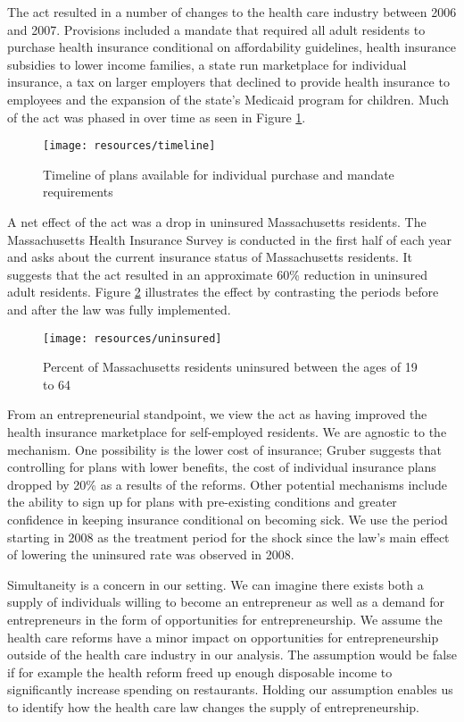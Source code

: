 \documentclass[12pt]{article}
\begin{document}
The act resulted in a number of changes to the health care industry between 2006 and 2007. Provisions included a mandate that required all adult residents to purchase health insurance conditional on affordability guidelines, health insurance subsidies to lower income families, a state run marketplace for individual insurance, a tax on larger employers that declined to provide health insurance to employees and the expansion of the state's Medicaid program for children. Much of the act was phased in over time as seen in Figure \ref{fig:reformTimeline}.

\begin{figure}[H]
	\centering
	\texttt{[image: resources/timeline]}
	\caption{Timeline of plans available for individual purchase and mandate requirements}
	\label{fig:reformTimeline}
\end{figure}

A net effect of the act was a drop in uninsured Massachusetts residents. The Massachusetts Health Insurance Survey is conducted in the first half of each year and asks about the current insurance status of Massachusetts residents. It suggests that the act resulted in an approximate 60\% reduction in uninsured adult residents. Figure \ref{fig:uninsuredRate} illustrates the effect by contrasting the periods before and after the law was fully implemented. 

\begin{figure}[H]
	\centering
	\texttt{[image: resources/uninsured]}
	\caption{Percent of Massachusetts residents uninsured between the ages of 19 to 64}
	\label{fig:uninsuredRate}
\end{figure}

From an entrepreneurial standpoint, we view the act as having improved the health insurance marketplace for self-employed residents. We are agnostic to the mechanism. One possibility is the lower cost of insurance; Gruber \cite{gruber_mass} suggests that controlling for plans with lower benefits, the cost of individual insurance plans dropped by 20\% as a results of the reforms. Other potential mechanisms include the ability to sign up for plans with pre-existing conditions and greater confidence in keeping insurance conditional on becoming sick. We use the period starting in 2008 as the treatment period for the shock since the law's main effect of lowering the uninsured rate was observed in 2008. 

Simultaneity is a concern in our setting. We can imagine there exists both a supply of individuals willing to become an entrepreneur as well as a demand for entrepreneurs in the form of opportunities for entrepreneurship. We assume the health care reforms have a minor impact on opportunities for entrepreneurship outside of the health care industry in our analysis. The assumption would be false if for example the health reform freed up enough disposable income to significantly increase spending on restaurants. Holding our assumption enables us to identify how the health care law changes the supply of entrepreneurship. 
\end{document}
